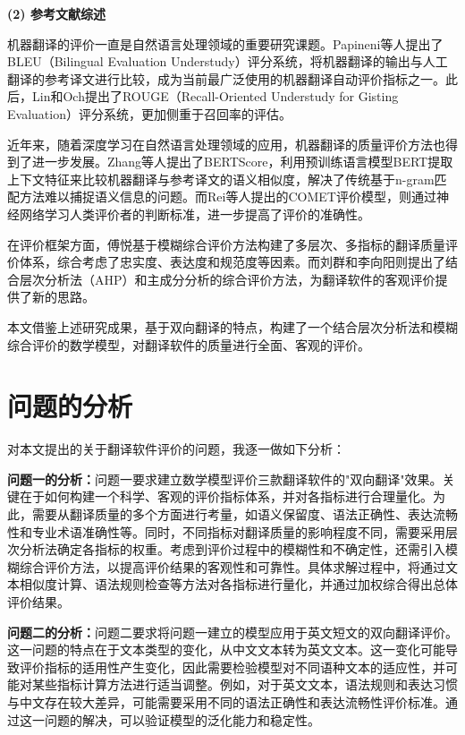 \documentclass[bwprint]{cumcmthesis}
\begin{document}
\textbf{(2) 参考文献综述}

机器翻译的评价一直是自然语言处理领域的重要研究课题。Papineni等人\cite{papineni2002bleu}提出了BLEU（Bilingual Evaluation Understudy）评分系统，将机器翻译的输出与人工翻译的参考译文进行比较，成为当前最广泛使用的机器翻译自动评价指标之一。此后，Lin和Och\cite{lin2004orange}提出了ROUGE（Recall-Oriented Understudy for Gisting Evaluation）评分系统，更加侧重于召回率的评估。

近年来，随着深度学习在自然语言处理领域的应用，机器翻译的质量评价方法也得到了进一步发展。Zhang等人\cite{zhang2020bertscore}提出了BERTScore，利用预训练语言模型BERT提取上下文特征来比较机器翻译与参考译文的语义相似度，解决了传统基于n-gram匹配方法难以捕捉语义信息的问题。而Rei等人\cite{rei2020comet}提出的COMET评价模型，则通过神经网络学习人类评价者的判断标准，进一步提高了评价的准确性。

在评价框架方面，傅悦\cite{fu2019translation}基于模糊综合评价方法构建了多层次、多指标的翻译质量评价体系，综合考虑了忠实度、表达度和规范度等因素。而刘群和李向阳\cite{liu2010comprehensive}则提出了结合层次分析法（AHP）和主成分分析的综合评价方法，为翻译软件的客观评价提供了新的思路。

本文借鉴上述研究成果，基于双向翻译的特点，构建了一个结合层次分析法和模糊综合评价的数学模型，对翻译软件的质量进行全面、客观的评价。


\section{问题的分析}
对本文提出的关于翻译软件评价的问题，我逐一做如下分析：

\textbf{问题一的分析：}问题一要求建立数学模型评价三款翻译软件的"双向翻译"效果。关键在于如何构建一个科学、客观的评价指标体系，并对各指标进行合理量化。为此，需要从翻译质量的多个方面进行考量，如语义保留度、语法正确性、表达流畅性和专业术语准确性等。同时，不同指标对翻译质量的影响程度不同，需要采用层次分析法确定各指标的权重。考虑到评价过程中的模糊性和不确定性，还需引入模糊综合评价方法，以提高评价结果的客观性和可靠性。具体求解过程中，将通过文本相似度计算、语法规则检查等方法对各指标进行量化，并通过加权综合得出总体评价结果。

\textbf{问题二的分析：}问题二要求将问题一建立的模型应用于英文短文的双向翻译评价。这一问题的特点在于文本类型的变化，从中文文本转为英文文本。这一变化可能导致评价指标的适用性产生变化，因此需要检验模型对不同语种文本的适应性，并可能对某些指标计算方法进行适当调整。例如，对于英文文本，语法规则和表达习惯与中文存在较大差异，可能需要采用不同的语法正确性和表达流畅性评价标准。通过这一问题的解决，可以验证模型的泛化能力和稳定性。
\end{document}
